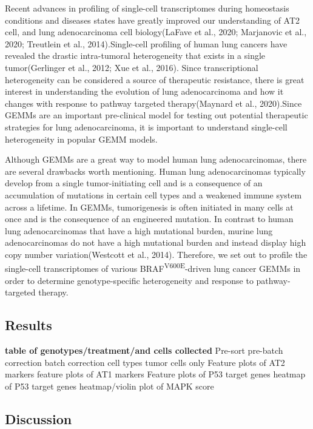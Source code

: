 Recent advances in profiling of single-cell transcriptomes during homeostasis conditions and diseases states have greatly improved our understanding of AT2 cell, and lung adenocarcinoma cell biology(LaFave et al., 2020; Marjanovic et al., 2020; Treutlein et al., 2014).Single-cell profiling of human lung cancers have revealed the drastic intra-tumoral heterogeneity that exists in a single tumor(Gerlinger et al., 2012; Xue et al., 2016). Since transcriptional heterogeneity can be considered a source of therapeutic resistance, there is great interest in understanding the evolution of lung adenocarcinoma and how it changes with response to pathway targeted therapy(Maynard et al., 2020).Since GEMMs are an important pre-clinical model for testing out potential therapeutic strategies for lung adenocarcinoma, it is important to understand single-cell heterogeneity in popular GEMM models.

Although GEMMs are a great way to model human lung adenocarcinomas, there are several drawbacks worth mentioning. Human lung adenocarcinomas typically develop from a single tumor-initiating cell and is a consequence of an accumulation of mutations in certain cell types and a weakened immune system across a lifetime. In GEMMs, tumorigenesis is often initiated in many cells at once and is the consequence of an engineered mutation. In contrast to human lung adenocarcinomas that have a high mutational burden, murine lung adenocarcinomas do not have a high mutational burden and instead display high copy number variation(Westcott et al., 2014). Therefore, we set out to profile the single-cell transcriptomes of various BRAF\textsuperscript{V600E}-driven lung cancer GEMMs in order to determine genotype-specific heterogeneity and response to pathway-targeted therapy.

\hypertarget{results-2}{%
\subsection{Results}\label{results-2}}

\textbf{table of genotypes/treatment/and cells collected}
Pre-sort
pre-batch correction
batch correction
cell types
tumor cells only
Feature plots of AT2 markers
feature plots of AT1 markers
Feature plots of P53 target genes
heatmap of P53 target genes
heatmap/violin plot of MAPK score

\hypertarget{discussion-2}{%
\subsection{Discussion}\label{discussion-2}}

